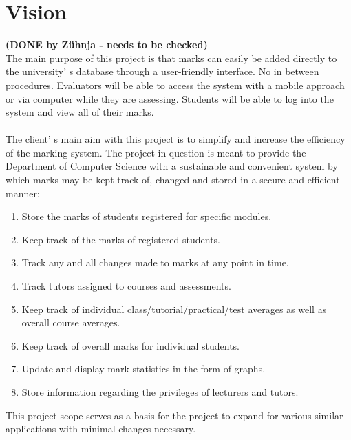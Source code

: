 \documentclass[11pt,a4paper]{article}
\begin{document}
\section{Vision}
\textbf{(DONE by Z\"uhnja - needs to be checked)}\\
The main purpose of this project is that marks can easily be added directly to the university\textquoteright
s database through a user-friendly interface. No in between procedures.   Evaluators will be able to access the system with a mobile approach or via computer while they are assessing.  Students will be able to log into the system and view all of their marks. \\ \\
The client\textquoteright
s main aim with this project is to simplify and increase the efficiency of the marking system.
The project in question is meant to provide the Department of Computer Science with a sustainable and convenient system by which marks may be kept track of, changed and stored in a secure and efficient manner:
\begin{enumerate}
\item Store the marks of students registered for specific modules.
\item Keep track of the marks of registered students.
\item Track any and all changes made to marks at any point in time.
\item Track tutors assigned to courses and assessments.
\item Keep track of individual class/tutorial/practical/test averages as well as overall course averages.
\item Keep track of overall marks for individual students.
\item Update and display mark statistics in the form of graphs.
\item Store information regarding the privileges of lecturers and tutors.
\end{enumerate}This project scope serves as a basis for the project to expand for various similar applications with minimal changes necessary.
\end{document}
